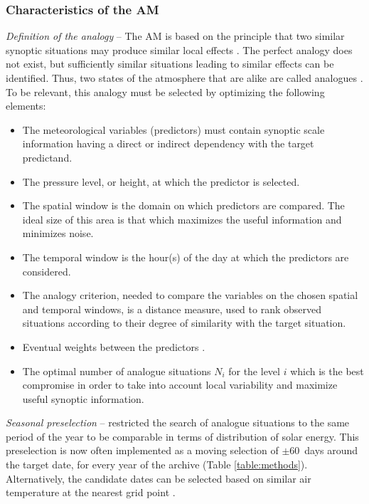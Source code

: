 \documentclass[review]{elsarticle}
\begin{document}
\subsubsection{Characteristics of the AM}

\textit{Definition of the analogy} -- The AM is based on the principle that two similar synoptic situations may produce similar local effects \citep{Lorenz1956}. The perfect analogy does not exist, but sufficiently similar situations leading to similar effects can be identified. Thus, two states of the atmosphere that are alike are called analogues \citep{Lorenz1969}. To be relevant, this analogy must be selected by optimizing the following elements:

\begin{itemize}		
	\item The meteorological variables (predictors) must contain synoptic scale information having a direct or indirect dependency with the target predictand.
	\item The pressure level, or height, at which the predictor is selected.
	\item The spatial window is the domain on which predictors are compared. The ideal size of this area is that which maximizes the useful information and minimizes noise.
	\item The temporal window is the hour(s) of the day at which the predictors are considered.
	\item The analogy criterion, needed to compare the variables on the chosen spatial and temporal windows, is a distance measure, used to rank observed situations according to their degree of similarity with the target situation.
	\item Eventual weights between the predictors \cite[e.g.,][]{Horton2017b, Junk2015}.
	\item The optimal number of analogue situations $N_{i}$ for the level $i$ which is the best compromise in order to take into account local variability and maximize useful synoptic information.
\end{itemize}

\textit{Seasonal preselection} -- \citet{Lorenz1969} restricted the search of analogue situations to the same period of the year to be comparable in terms of distribution of solar energy. This preselection is now often implemented as a moving selection of $\pm$60~days around the target date, for every year of the archive (Table \ref{table:methods}). Alternatively, the candidate dates can be selected based on similar air temperature at the nearest grid point \citep[Table \ref{table:methods}][]{BenDaoud2016}.
\end{document}
